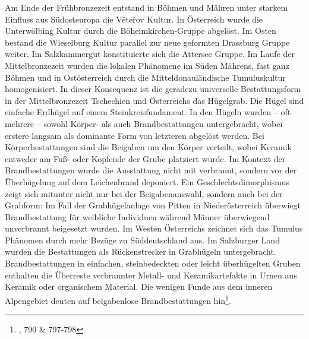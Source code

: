 \documentclass[openany,twoside,twocolumn]{book}
\let\rmarkdownfootnote\footnote%
\def\footnote{\protect\rmarkdownfootnote}
\begin{document}
Am Ende der Frühbronzezeit entstand in Böhmen und Mähren unter starkem
Einfluss aus Südosteuropa die Věteřov Kultur. In Österreich wurde die
Unterwölbing Kultur durch die Böheimkirchen-Gruppe abgelöst. Im Osten
bestand die Wieselburg Kultur parallel zur neue geformten Drassburg
Gruppe weiter. Im Salzkammergut konstituierte sich die Attersee Gruppe.
Im Laufe der Mittelbronzezeit wurden die lokalen Phänomene im Süden
Mährens, fast ganz Böhmen und in Ostösterreich durch die
Mitteldonauländische Tumuluskultur homogenisiert. In dieser Konsequenz
ist die geradezu universelle Bestattungsform in der Mittelbronzezeit
Tschechien und Österreichs das Hügelgrab. Die Hügel sind einfache
Erdhügel auf einem Steinkreisfundament. In den Hügeln wurden -- oft
mehrere -- sowohl Körper- als auch Brandbestattungen untergebracht,
wobei erstere langsam als dominante Form von letzteren abgelöst werden.
Bei Körperbestattungen sind die Beigaben um den Körper verteilt, wobei
Keramik entweder am Fuß- oder Kopfende der Grube platziert wurde. Im
Kontext der Brandbestattungen wurde die Ausstattung nicht mit verbrannt,
sondern vor der Überhügelung auf dem Leichenbrand deponiert. Ein
Geschlechtsdimorphismus zeigt sich mitunter nicht nur bei der
Beigabenauswahl, sondern auch bei der Grabform: Im Fall der
Grabhügelanlage von Pitten in Niederösterreich überwiegt Brandbestattung
für weibliche Individuen während Männer überwiegend unverbrannt
beigesetzt wurden. Im Westen Österreichs zeichnet sich das Tumulus
Phänomen durch mehr Bezüge zu Süddeutschland aus. Im Salzburger Land
wurden die Bestattungen als Rückenstrecker in Grabhügeln untergebracht.
Brandbestattungen in einfachen, steinbedeckten oder leicht überhügelten
Gruben enthalten die Überreste verbrannter Metall- und Keramikartefakte
in Urnen aus Keramik oder organischem Material. Die wenigen Funde aus
dem inneren Alpengebiet deuten auf beigabenlose Brandbestattungen
hin\footnote{\textcite{lubos_czech_2013}, 790 \& 797-798}.
\end{document}
